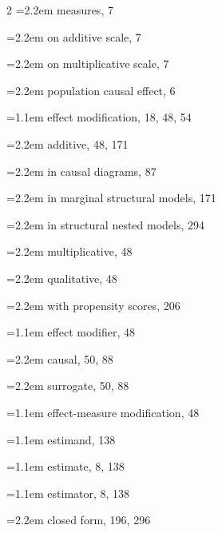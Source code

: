 \begin{multicols}{2}
\hspace*{1.1em}\hangindent=2.2em measures, 7\par
\hspace*{1.1em}\hangindent=2.2em on additive scale, 7\par
\hspace*{1.1em}\hangindent=2.2em on multiplicative scale, 7\par
\hspace*{1.1em}\hangindent=2.2em population causal effect, 6\par
\hangindent=1.1em effect modification, 18, 48, 54\par
\hspace*{1.1em}\hangindent=2.2em additive, 48, 171\par
\hspace*{1.1em}\hangindent=2.2em in causal diagrams, 87\par
\hspace*{1.1em}\hangindent=2.2em in marginal structural models, 171\par
\hspace*{1.1em}\hangindent=2.2em in structural nested models, 294\par
\hspace*{1.1em}\hangindent=2.2em multiplicative, 48\par
\hspace*{1.1em}\hangindent=2.2em qualitative, 48\par
\hspace*{1.1em}\hangindent=2.2em with propensity scores, 206\par
\hangindent=1.1em effect modifier, 48\par
\hspace*{1.1em}\hangindent=2.2em causal, 50, 88\par
\hspace*{1.1em}\hangindent=2.2em surrogate, 50, 88\par
\hangindent=1.1em effect-measure modification, 48\par
\hangindent=1.1em estimand, 138\par
\hangindent=1.1em estimate, 8, 138\par
\hangindent=1.1em estimator, 8, 138\par
\hspace*{1.1em}\hangindent=2.2em closed form, 196, 296\par

\end{multicols}
